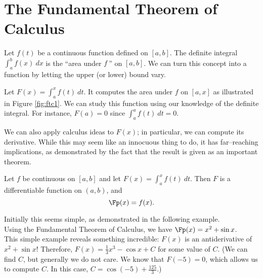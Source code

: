 \section{The Fundamental Theorem of Calculus}\label{sec:FTC}

Let $f(t)$ be a continuous function defined on $[a,b]$. The definite integral $\int_a^b f(x)\ dx$ is the ``area under $f\ $'' on $[a,b]$. We can turn this concept into a function by letting the upper (or lower) bound vary.

Let $F(x) = \int_a^x f(t)\ dt$. It computes the area under $f$ on $[a,x]$ as illustrated in Figure \ref{fig:ftc1}. We can study this function using our knowledge of the definite integral. For instance, $F(a)=0$ since $\int_a^af(t)\ dt=0$. %


We can also apply calculus ideas to $F(x)$; in particular, we can compute its derivative. While this may seem like an innocuous thing to do, it has far--reaching implications, as demonstrated by the fact that the result is given as an important theorem.

{Let $f$ be continuous on $[a,b]$ and let $F(x) = \int_a^x f(t)\ dt$. Then $F$ is a differentiable function on $(a,b)$, and $$\Fp(x)=f(x).$$
}

Initially this seems simple, as demonstrated in the following example.\\

{Using the Fundamental Theorem of Calculus, we have $\Fp(x) = x^2+\sin x$.
}\\

This simple example reveals something incredible: $F(x)$ is an antiderivative of $x^2+\sin x$! Therefore, $F(x) = \frac13x^3-\cos x+C$ for some value of $C$. (We can find $C$, but generally we do not care. We know that $F(-5)=0$, which allows us to compute $C$. In this case, $C=\cos(-5)+\frac{125}3$.)

